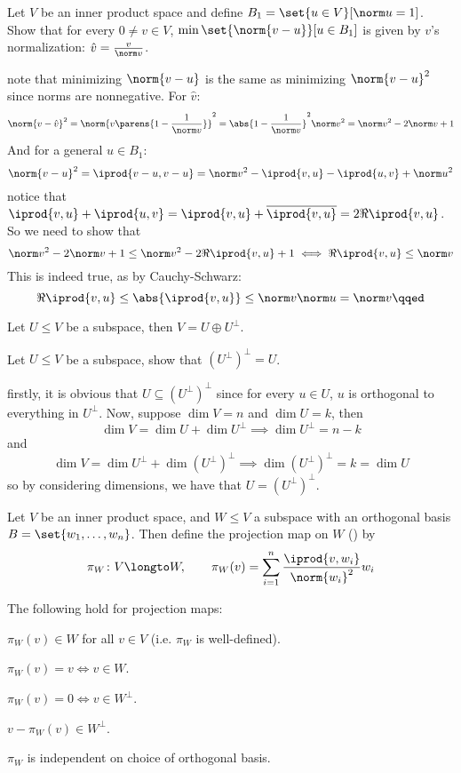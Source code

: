 \bexerc

    Let $V$ be an inner product space and define $B_1=\set{u\in V}[\norm u=1]$.
    Show that for every $0\neq v\in V$, $\min\set{\norm{v-u}}[u\in B_1]$ is given by $v$'s normalization: $\hat v=\frac v{\norm v}$.

\eexerc

\Proof note that minimizing $\norm{v-u}$ is the same as minimizing $\norm{v-u}^2$ since norms are nonnegative.
For $\hat v$:
$$ \norm{v-\hat v}^2 = \norm{v\parens{1-\frac1{\norm v}}}^2 = \abs{1-\frac1{\norm v}}^2\norm v^2 = \norm v^2 - 2\norm v + 1 $$
And for a general $u\in B_1$:
$$ \norm{v-u}^2 = \iprod{v-u,v-u} = \norm v^2 - \iprod{v,u} - \iprod{u,v} + \norm u^2 $$
notice that $\iprod{v,u}+\iprod{u,v}=\iprod{v,u}+\overline{\iprod{v,u}}=2\Re\iprod{v,u}$.
So we need to show that
$$ \norm v^2 - 2\norm v + 1 \leq \norm v^2 - 2\Re\iprod{v,u} + 1 \iff \Re\iprod{v,u} \leq \norm v $$
This is indeed true, as by Cauchy-Schwarz:
$$ \Re\iprod{v,u} \leq \abs{\iprod{v,u}} \leq \norm v\norm u = \norm v \qqed $$

\bthrm

    Let $U\leq V$ be a subspace, then $V=U\oplus U^\perp$.

\ethrm

\bexerc

    Let $U\leq V$ be a subspace, show that $(U^\perp)^\perp=U$.

\eexerc

\Proof firstly, it is obvious that $U\subseteq(U^\perp)^\perp$ since for every $u\in U$, $u$ is orthogonal to everything in $U^\perp$.
Now, suppose $\dim V=n$ and $\dim U=k$, then
$$ \dim V = \dim U + \dim U^\perp \implies \dim U^\perp = n - k$$
and
$$ \dim V = \dim U^\perp + \dim(U^\perp)^\perp \implies \dim(U^\perp)^\perp = k = \dim U $$
so by considering dimensions, we have that $U=(U^\perp)^\perp$.
\qqed

\bdefn

    Let $V$ be an inner product space, and $W\leq V$ a subspace with an orthogonal basis $B=\set{w_1,\dots,w_n}$.
    Then define the {\emphcolor projection map on $W$} () by
    $$ \pi_W\colon V\longto W,\qquad \pi_W(v) = \sum_{i=1}^n\frac{\iprod{v,w_i}}{\norm{w_i}^2}w_i $$

\edefn

\bthrm

    The following hold for projection maps:
    \benum
        \item $\pi_W(v)\in W$ for all $v\in V$ (i.e. $\pi_W$ is well-defined).
        \item $\pi_W(v)=v\iff v\in W$.
        \item $\pi_W(v)=0\iff v\in W^\perp$.
        \item $v-\pi_W(v)\in W^\perp$.
        \item $\pi_W$ is independent on choice of orthogonal basis.
    \eenum

